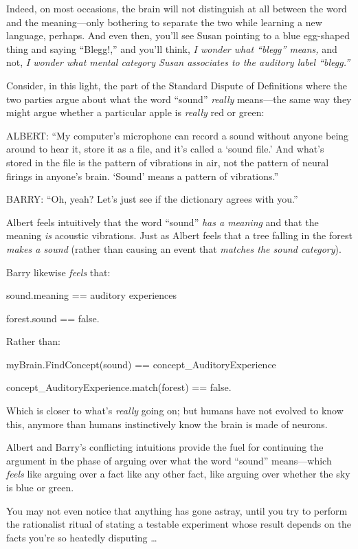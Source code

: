 {
 Indeed, on most occasions, the brain will not distinguish at all
between the word and the meaning---only bothering to separate the two
while learning a new language, perhaps. And even then,
you'll see Susan pointing to a blue egg-shaped thing
and saying ``Blegg!,'' and
you'll think, \textit{I wonder what
``blegg'' means,} and not, \textit{I
wonder what mental category Susan associates to the auditory label
``blegg.''}}

{
 Consider, in this light, the part of the Standard Dispute of
Definitions where the two parties argue about what the word
``sound'' \textit{really}
means---the same way they might argue whether a particular apple is
\textit{really} red or green:}

{
 ALBERT: ``My computer's
microphone can record a sound without anyone being around to hear it,
store it as a file, and it's called a
`sound file.' And what's
stored in the file is the pattern of vibrations in air, not the pattern
of neural firings in anyone's brain.
`Sound' means a pattern of
vibrations.''}

{
 BARRY: ``Oh, yeah? Let's just see
if the dictionary agrees with you.''}

{
 Albert feels intuitively that the word
``sound'' \textit{has a meaning} and
that the meaning \textit{is} acoustic vibrations. Just as Albert feels
that a tree falling in the forest \textit{makes a sound} (rather than
causing an event that \textit{matches the sound category}).}

{
 Barry likewise \textit{feels} that:}

{
 sound.meaning == auditory experiences}

{
 forest.sound == false.}

{
 Rather than:}

{
 myBrain.FindConcept({\textquotedbl}sound{\textquotedbl}) ==
concept\_AuditoryExperience}

{
 concept\_AuditoryExperience.match(forest) == false.}

{
 Which is closer to what's \textit{really} going
on; but humans have not evolved to know this, anymore than humans
instinctively know the brain is made of neurons.}

{
 Albert and Barry's conflicting intuitions provide
the fuel for continuing the argument in the phase of arguing over what
the word ``sound'' means---which
\textit{feels} like arguing over a fact like any other fact, like
arguing over whether the sky is blue or green.}

{
 You may not even notice that anything has gone astray, until you
try to perform the rationalist ritual of stating a testable experiment
whose result depends on the facts you're so heatedly
disputing \ldots}

